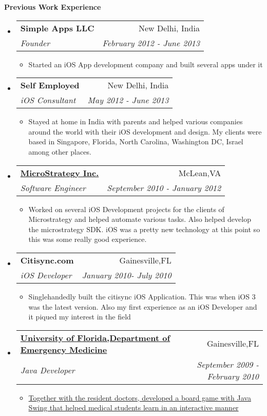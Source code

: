 \documentclass[letterpaper,11pt]{article}
\makeatletter
\newcommand{\resitem}[1]{\item #1 \vspace{-2pt}}
\newcommand{\resheading}[1]{{\large \colorbox{mygrey}{\begin{minipage}{\textwidth}{\textbf{#1 \vphantom{p\^{E}}}}\end{minipage}}}}
\newcommand{\ressubheading}[4]{
\begin{tabular*}{7.0in}{l@{\extracolsep{\fill}}r}
    \textbf{#1} & #2 \\
    \textit{#3} & \textit{#4} \\
\end{tabular*}\vspace{-6pt}}
\makeatother
\begin{document}
\vspace{0.7in}

\resheading{Previous Work Experience}
\begin{itemize}

\item
    \ressubheading{Simple Apps LLC}{New Delhi, India}{Founder}{February 2012 - June 2013}
    \begin{itemize}
        \resitem{Started an iOS App development company and built several apps under it}
    \end{itemize}
    
\item
    \ressubheading{{Self Employed}}{New Delhi, India}{iOS Consultant}{May 2012 - June 2013}
    \begin{itemize}
        \resitem{Stayed at home in India with parents and helped various companies around the world with their iOS development and design. My clients were based in Singapore, Florida, North Carolina, Washington DC, Israel among other places.}
        
    \end{itemize}


\item
    \ressubheading{\href{http://www.microstrategy.com/Company}{MicroStrategy Inc.}}{McLean,VA}{Software Engineer}{September 2010 - January 2012}
    \begin{itemize}
        \resitem{Worked on several iOS Development projects for the clients of Microstrategy and helped automate various tasks. Also helped develop the microstrategy SDK. iOS was a pretty new technology at this point so this was some really good experience.}
    \end{itemize}
    

\item
    \ressubheading{Citisync.com}{Gainesville,FL}{iOS Developer}{January 2010- July 2010}
    \begin{itemize}
        \resitem{Singlehandedly built the citisync iOS Application. This was when iOS 3 was the latest version. Also my first experience as an iOS Developer and it piqued my interest in the field}
    \end{itemize}

\item
    \ressubheading{\href{http://emergency.med.ufl.edu}{University of Florida,Department of Emergency Medicine}}{Gainesville,FL}{Java Developer}{September 2009 - February 2010}
    \begin{itemize}
        \resitem{\href{http://onlinelibrary.wiley.com/doi/10.1111/j.1553-2712.2009.00392_16.x/abstract}{Together with the resident doctors, developed a board game with Java Swing that helped medical students learn in an interactive manner}}
    \end{itemize}
                

\end{itemize}
\end{document}
